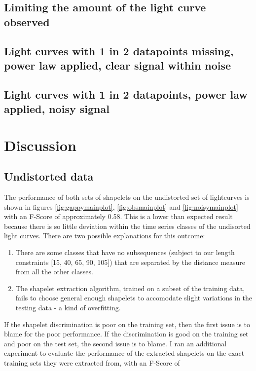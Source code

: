 \subsection{Limiting the amount of the light curve observed}
%
\clearpage

\clearpage
\subsection{Light curves with 1 in 2 datapoints missing, power law applied, clear signal within noise}
%
\clearpage
\subsection{Light curves with 1 in 2 datapoints, power law applied, noisy signal}
%
\clearpage

\section{Discussion}
\subsection{Undistorted data}
The performance of both sets of shapelets on the undistorted set of lightcurves is shown in figures \ref{fig:gappymainplot}, \ref{fig:obsmainplot} and \ref{fig:noisymainplot} with an F-Score of approximately 0.58. This is a lower than expected result because there is so little deviation within the time series classes of the undisorted light curves. There are two possible explanations for this outcome:
\begin{enumerate}
	\item There are some classes that have no subsequences (subject to our length constraints [15, 40, 65, 90, 105]) that are separated by the distance measure from all the other classes.
	\item The shapelet extraction algorithm, trained on a subset of the training data, fails to choose general enough shapelets to accomodate slight variations in the testing data - a kind of overfitting.
\end{enumerate}
If the shapelet discrimination is poor on the training set, then the first issue is to blame for the poor performance. If the discrimination is good on the training set and poor on the test set, the second issue is to blame. I ran an additional experiment to evaluate the performance of the extracted shapelets on the exact training sets they were extracted from, with an F-Score of 


